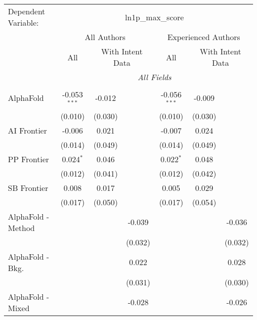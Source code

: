 \begingroup
\centering
\begin{tabular}{lcccccc}
   \tabularnewline \midrule \midrule
   Dependent Variable: & \multicolumn{6}{c}{ln1p\_max\_score}\\
 & \multicolumn{3}{c}{All Authors} & \multicolumn{3}{c}{Experienced Authors} \\
\cmidrule(lr){2-4} \cmidrule(lr){5-7}
 & \multicolumn{1}{c}{All} & \multicolumn{2}{c}{With Intent Data} & \multicolumn{1}{c}{All} & \multicolumn{2}{c}{With Intent Data} \\
\cmidrule(lr){2-2} \cmidrule(lr){3-4} \cmidrule(lr){5-5} \cmidrule(lr){6-7}
 & \multicolumn{6}{c}{\textit{All Fields}} \\ \\
   AlphaFold            & -0.053$^{***}$ & -0.012  &            & -0.056$^{***}$ & -0.009  &   \\   
                        & (0.010)        & (0.030) &            & (0.010)        & (0.030) &   \\   
   AI Frontier          & -0.006         & 0.021   &            & -0.007         & 0.024   &   \\   
                        & (0.014)        & (0.049) &            & (0.014)        & (0.049) &   \\   
   PP Frontier          & 0.024$^{*}$    & 0.046   &            & 0.022$^{*}$    & 0.048   &   \\   
                        & (0.012)        & (0.041) &            & (0.012)        & (0.042) &   \\   
   SB Frontier          & 0.008          & 0.017   &            & 0.005          & 0.029   &   \\   
                        & (0.017)        & (0.050) &            & (0.017)        & (0.054) &   \\   
   AlphaFold - Method   &                &         & -0.039     &                &         & -0.036\\   
                        &                &         & (0.032)    &                &         & (0.032)\\   
   AlphaFold - Bkg.     &                &         & 0.022      &                &         & 0.028\\   
                        &                &         & (0.031)    &                &         & (0.030)\\   
   AlphaFold - Mixed    &                &         & -0.028     &                &         & -0.026\\   

\end{tabular}
